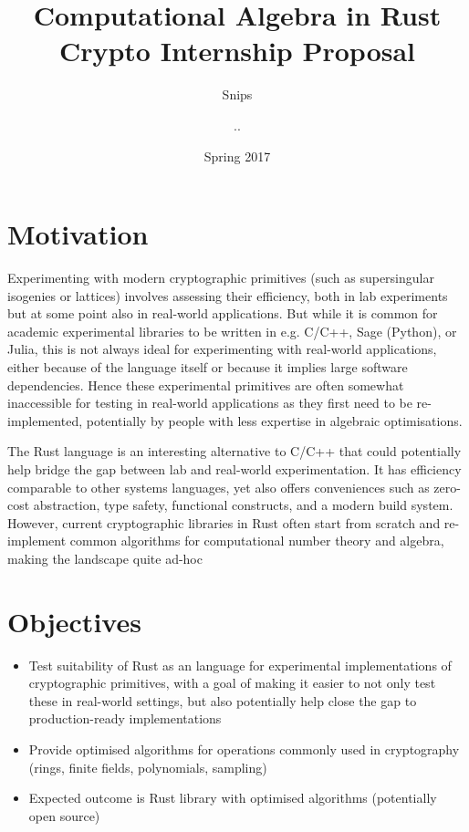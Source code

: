 \documentclass{article}
\title{Computational Algebra in Rust \\ {\large Crypto Internship Proposal}}
\author{{\small Snips} \and {\small ..}}
\date{Spring 2017}
\begin{document}
\maketitle

\section*{Motivation}
Experimenting with modern cryptographic primitives (such as supersingular isogenies or lattices) involves assessing their efficiency, both in lab experiments but at some point also in real-world applications. But while it is common for academic experimental libraries to be written in e.g. C/C++, Sage (Python), or Julia, this is not always ideal for experimenting with real-world applications, either because of the language itself or because it implies large software dependencies. Hence these experimental primitives are often somewhat inaccessible for testing in real-world applications as they first need to be re-implemented, potentially by people with less expertise in algebraic optimisations. 

The Rust language is an interesting alternative to C/C++ that could potentially help bridge the gap between lab and real-world experimentation. It has efficiency comparable to other systems languages, yet also offers conveniences such as zero-cost abstraction, type safety, functional constructs, and a modern build system. However, current cryptographic libraries in Rust often start from scratch and re-implement common algorithms for computational number theory and algebra, making the landscape quite ad-hoc


\section*{Objectives}
\begin{itemize}
\item Test suitability of Rust as an language for experimental implementations of cryptographic primitives, with a goal of making it easier to not only test these in real-world settings, but also potentially help close the gap to production-ready implementations
\item Provide optimised algorithms for operations commonly used in cryptography (rings, finite fields, polynomials, sampling)
\item Expected outcome is Rust library with optimised algorithms (potentially open source)
\end{itemize}
\end{document}
